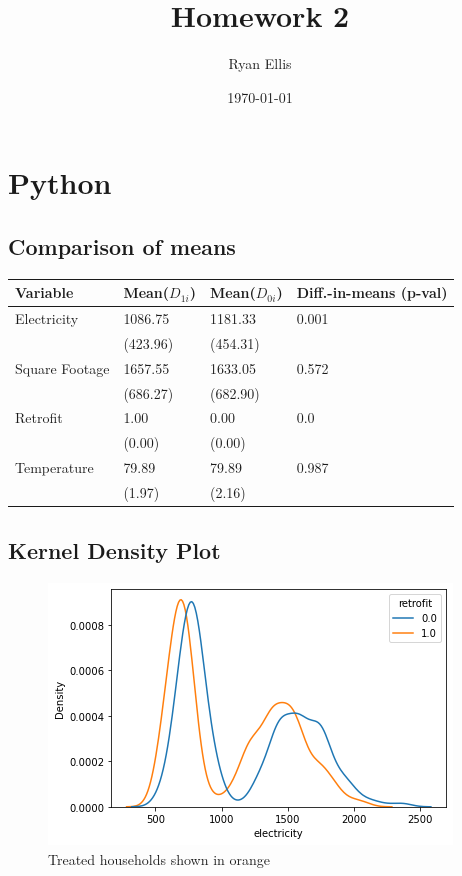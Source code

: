 \documentclass{article}
\title{Homework 2}
\author{Ryan Ellis}
\date{\today}
\begin{document}
  
\maketitle

\section{Python}
\subsection{Comparison of means}


\begin{longtable}{llll}
\hline
 Variable       & Mean($D_{1i}$)   & Mean($D_{0i}$)   & Diff.-in-means (p-val)   \\
\hline
\endhead
 Electricity    & 1086.75                 & 1181.33               & 0.001                          \\
                & (423.96)                & (454.31)              &                                \\
 Square Footage & 1657.55                 & 1633.05               & 0.572                          \\
                & (686.27)                & (682.90)              &                                \\
 Retrofit       & 1.00                    & 0.00                  & 0.0                            \\
                & (0.00)                  & (0.00)                &                                \\
 Temperature    & 79.89                   & 79.89                 & 0.987                          \\
                & (1.97)                  & (2.16)                &                                \\
\hline
\end{longtable}


\subsection{Kernel Density Plot}

\begin{figure}[ht]
    \centering
    \includegraphics[scale = 0.7]{kdeplot.png}
    \caption{Treated households shown in orange}

\end{figure}
\end{document}
